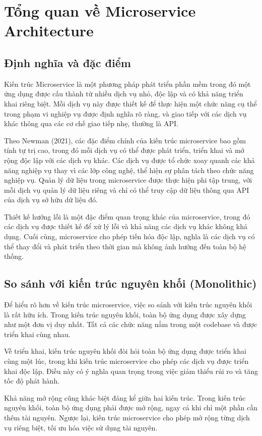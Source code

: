 \section{Tổng quan về Microservice Architecture}

\subsection{Định nghĩa và đặc điểm}
Kiến trúc Microservice là một phương pháp phát triển phần mềm trong đó một ứng
dụng được cấu thành từ nhiều dịch vụ nhỏ, độc lập và có khả năng triển khai
riêng biệt. Mỗi dịch vụ này được thiết kế để thực hiện một chức năng cụ thể
trong phạm vi nghiệp vụ được định nghĩa rõ ràng, và giao tiếp với các dịch vụ
khác thông qua các cơ chế giao tiếp nhẹ, thường là API.

Theo Newman (2021), các đặc điểm chính của kiến trúc microservice bao gồm tính
tự trị cao, trong đó mỗi dịch vụ có thể được phát triển, triển khai và mở rộng
độc lập với các dịch vụ khác. Các dịch vụ được tổ chức xoay quanh các khả năng
nghiệp vụ thay vì các lớp công nghệ, thể hiện sự phân tách theo chức năng
nghiệp vụ. Quản lý dữ liệu trong microservice được thực hiện phi tập trung, với
mỗi dịch vụ quản lý dữ liệu riêng và chỉ có thể truy cập dữ liệu thông qua API
của dịch vụ sở hữu dữ liệu đó.

Thiết kế hướng lỗi là một đặc điểm quan trọng khác của microservice, trong đó
các dịch vụ được thiết kế để xử lý lỗi và khả năng các dịch vụ khác không khả
dụng. Cuối cùng, microservice cho phép tiến hóa độc lập, nghĩa là các dịch vụ
có thể thay đổi và phát triển theo thời gian mà không ảnh hưởng đến toàn bộ hệ
thống.

\subsection{So sánh với kiến trúc nguyên khối (Monolithic)}
Để hiểu rõ hơn về kiến trúc microservice, việc so sánh với kiến trúc nguyên khối là rất hữu ích. Trong kiến trúc nguyên khối, toàn bộ ứng dụng được xây dựng như một đơn vị duy nhất. Tất cả các chức năng nằm trong một codebase và được triển khai cùng nhau.

Về triển khai, kiến trúc nguyên khối đòi hỏi toàn bộ ứng dụng được triển khai
cùng một lúc, trong khi kiến trúc microservice cho phép các dịch vụ được triển
khai độc lập. Điều này có ý nghĩa quan trọng trong việc giảm thiểu rủi ro và
tăng tốc độ phát hành.

Khả năng mở rộng cũng khác biệt đáng kể giữa hai kiến trúc. Trong kiến trúc
nguyên khối, toàn bộ ứng dụng phải được mở rộng, ngay cả khi chỉ một phần cần
thêm tài nguyên. Ngược lại, kiến trúc microservice cho phép mở rộng từng dịch
vụ riêng biệt, tối ưu hóa việc sử dụng tài nguyên.

